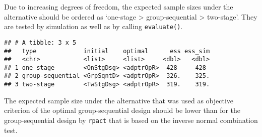 \documentclass[]{book}
\newenvironment{Shaded}{\begin{snugshade}}{\end{snugshade}}
\newcommand{\CommentTok}[1]{\textcolor[rgb]{0.56,0.35,0.01}{\textit{#1}}}
\newcommand{\DataTypeTok}[1]{\textcolor[rgb]{0.13,0.29,0.53}{#1}}
\newcommand{\DecValTok}[1]{\textcolor[rgb]{0.00,0.00,0.81}{#1}}
\newcommand{\FloatTok}[1]{\textcolor[rgb]{0.00,0.00,0.81}{#1}}
\newcommand{\KeywordTok}[1]{\textcolor[rgb]{0.13,0.29,0.53}{\textbf{#1}}}
\newcommand{\NormalTok}[1]{#1}
\newcommand{\OperatorTok}[1]{\textcolor[rgb]{0.81,0.36,0.00}{\textbf{#1}}}
\newcommand{\StringTok}[1]{\textcolor[rgb]{0.31,0.60,0.02}{#1}}
\begin{document}
Due to increasing degrees of freedom, the expected sample sizes under the
alternative should be ordered as `one-stage \textgreater{} group-sequential \textgreater{} two-stage'.
They are tested by simulation as well as by calling \texttt{evaluate()}.

\begin{Shaded}
\end{Shaded}

\begin{verbatim}
## # A tibble: 3 x 5
##   type             initial    optimal      ess ess_sim
##   <chr>            <list>     <list>     <dbl>   <dbl>
## 1 one-stage        <OnStgDsg> <adptrOpR>  428     428 
## 2 group-sequential <GrpSqntD> <adptrOpR>  326.    325.
## 3 two-stage        <TwStgDsg> <adptrOpR>  319.    319.
\end{verbatim}

The expected sample size under the alternative that was used as objective criterion
of the optimal group-sequential design should be lower than for the
group-sequential design by \texttt{rpact} that is based on the inverse normal
combination test.
\end{document}
